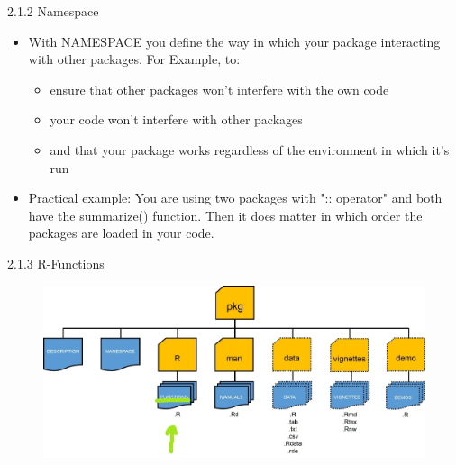\documentclass[11pt,a4paper]{beamer}
\begin{document}
\begin{frame}[t]{2.1.2 Namespace}
	
	\begin{itemize}
		\item With NAMESPACE you define  the way in which your package interacting with other packages. For Example, to:
		\begin{itemize}
			\item ensure that other	packages won’t	interfere	with the own code 
			\item	your code	won’t	interfere	with	other	packages 	
			\item and	that	your	package	works	regardless	of	the
			environment	in	which	it’s	run
		\end{itemize}
		
		
		\item Practical example: You are using two packages with "::	operator" and both have the summarize() function. Then it does matter in which order the packages are loaded in your code. 
		
	\end{itemize}
	
\end{frame}






\begin{frame}[t]{2.1.3 R-Functions}
	
	
	\begin{figure}
		\centering
		\includegraphics[width=0.9\linewidth]{Rfunc}
		\label{fig:packages}
	\end{figure}
	
	
\end{frame}
\end{document}
